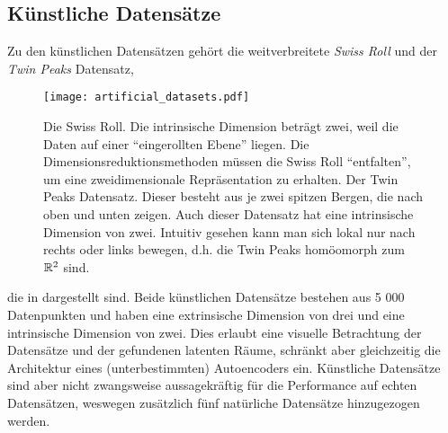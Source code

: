 \subsection{Künstliche Datensätze}
\label{ch:Vergleich:sec:VerwendeteDatensaetze:kuenstlich}
Zu den künstlichen Datensätzen gehört die weitverbreitete \textit{Swiss Roll} und der \textit{Twin Peaks} Datensatz,
\begin{figure}[ht]
	\begin{center}
		\texttt{[image: artificial\_datasets.pdf]}
	\end{center}
	\caption[Künstliche Datensätze]{\figleft Die Swiss Roll. Die intrinsische Dimension beträgt zwei, weil die Daten auf einer \enquote{eingerollten Ebene} liegen. Die Dimensionsreduktionsmethoden müssen die Swiss Roll \enquote{entfalten}, um eine zweidimensionale Repräsentation zu erhalten. \figright Der Twin Peaks Datensatz. Dieser besteht aus je zwei spitzen Bergen, die nach oben und unten zeigen. Auch dieser Datensatz hat eine intrinsische Dimension von zwei. Intuitiv gesehen kann man sich lokal nur nach rechts oder links bewegen, d.h. die Twin Peaks homöomorph zum $\mathbb{R}^2$ sind.}
	\label{fig:ArtificialDatasets}
\end{figure}
die in  dargestellt sind.
Beide künstlichen Datensätze bestehen aus 5 000 Datenpunkten und haben eine extrinsische Dimension von drei und eine intrinsische
Dimension von zwei. Dies erlaubt eine visuelle Betrachtung der Datensätze und der gefundenen
latenten Räume, schränkt aber gleichzeitig die Architektur eines (unterbestimmten) Autoencoders
ein. Künstliche Datensätze sind aber nicht zwangsweise aussagekräftig für die Performance auf echten Datensätzen, weswegen zusätzlich fünf natürliche Datensätze hinzugezogen werden.

